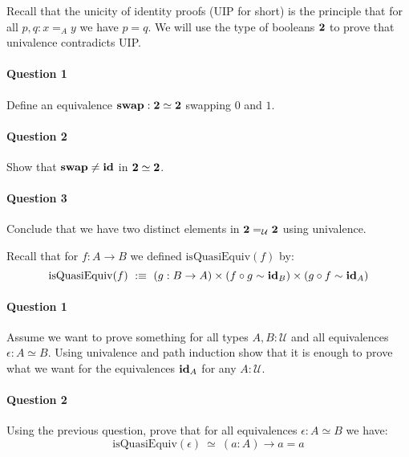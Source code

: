 \documentclass{article}[6pt]%
\newcommand{\U}{{\mathcal U}}
\renewcommand{\r}{\rightarrow}
\newcommand{\id}{\mathrm{\bf id}}
\newcommand{\two}{{\bf 2}}
\newtheorem{remark}{Remark}
\begin{document}
\begin{Exercise}[title={Univalence contradicts unicity of identity proofs}]
Recall that the unicity of identity proofs (UIP for short) is the principle that for all $p,q:x=_Ay$ we have $p=q$. We will use the type of booleans $\two$ to prove that univalence contradicts UIP.

\paragraph{Question 1} Define an equivalence $\mathrm{\bf swap} : \two\simeq \two$
swapping $0$ and $1$.

\paragraph{Question 2} Show that $\mathrm{\bf swap}\neq \id$ in $\two\simeq\two$.

\paragraph{Question 3} Conclude that we have two distinct elements in $\two=_\U\two$ using univalence.
 
\end{Exercise}


\begin{Exercise}[title={Quasi-equivalences},difficulty=1]
Recall that for $f:A\r B$ we defined $\mathrm{isQuasiEquiv}(f)$ by:
\[\mathrm{isQuasiEquiv}(f)\ :\equiv\ (g:B\r A)\times (f\circ g\sim \id_B) \times (g\circ f\sim \id_A)\]

\paragraph{Question 1}
Assume we want to prove something for all types $A,B:\U$ and all equivalences $\epsilon : A\simeq B$. Using univalence and path induction show that it is enough to prove what we want for the equivalences $\id_A$ for any $A:\U$.


\paragraph{Question 2}
Using the previous question, prove that for all equivalences $\epsilon:A\simeq B$ we have:
\[\mathrm{isQuasiEquiv}(\epsilon) \ \simeq \ (a:A)\r a=a\]

\end{Exercise}
\end{document}
